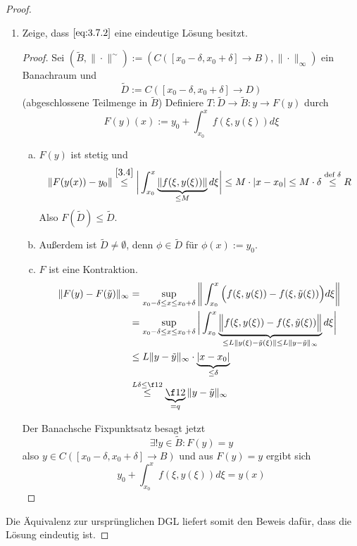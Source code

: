 \begin{st}
\begin{proof}
\begin{enumerate}[1)]
\begin{proof}
\begin{seg}
					\end{seg}
				\end{proof}
			\item
				Zeige, dass $\eqref{eq:3.7.2}$ eine eindeutige Lösung besitzt.
				\begin{proof}
					Sei $(\tilde B, \|\cdot\|^{\sim}) := (C([x_0-\delta, x_0+\delta] \to B), \|\cdot\|_\infty)$ ein Banachraum und
					\[
						\tilde D := C([x_0 -\delta, x_0 + \delta] \to D) 
					\]
					(abgeschlossene Teilmenge in $\tilde B$)
					Definiere $T: \tilde D \to \tilde B : y \to F(y)$ durch
					\[
						F(y)(x) := y_0 + \int_{x_0}^x f(\xi, y(\xi)) d\xi
					\]
					\begin{enumerate}[a)]
						\item
							$F(y)$ ist stetig und
							\[
								\|F(y(x)) - y_0 \|
								\stackrel{\ref{3.4}}\le \bigg| \int_{x_0}^x \underbrace{\|f(\xi, y(\xi))\|}_{\le M} d\xi \bigg|
								\le M \cdot |x - x_0|
								\le M \cdot \delta
								\stackrel{\text{def } \delta}\le R
							\]
							Also $F(\tilde D ) \le \tilde D$.
						\item
							Außerdem ist $\tilde D \neq \emptyset$, denn $\phi \in \tilde D$ für $\phi(x) := y_0$.
						\item
							$F$ ist eine Kontraktion.
							\begin{align*}
								\|F(y) - F(\tilde y)\|_\infty
								&= \sup_{x_0-\delta \le x \le x_0+\delta} \bigg\| \int_{x_0}^x \Big( f(\xi, y(\xi)) - f(\xi, \tilde y(\xi)) \Big) d\xi \bigg\| \\
								&= \sup_{x_0-\delta \le x \le x_0+\delta} \bigg| \int_{x_0}^x \underbrace{\Big\| f(\xi, y(\xi)) - f(\xi, \tilde y(\xi)) \Big\|}_{\le L \|y(\xi)-\tilde y(\xi)\| \le L \|y-\tilde y\|_\infty} d\xi \bigg| \\
								&\le L \|y-\tilde y\|_\infty \cdot \underbrace{|x-x_0|}_{\le \delta} \\
								&\stackrel{L \delta \le \f 12} \le \underbrace{\f 12}_{=q} \|y-\tilde y\|_\infty
							\end{align*}
					\end{enumerate}
					Der Banachsche Fixpunktsatz besagt jetzt
					\[
						\exists! y \in \tilde B : F(y) = y
					\]
					also $y \in C([x_0-\delta, x_0+\delta] \to B)$ und aus $F(y) = y$ ergibt sich
					\[
						y_0  + \int_{x_0}^x f(\xi, y(\xi)) d \xi = y(x)
					\]
				\end{proof}
		\end{enumerate}
		Die Äquivalenz zur ursprünglichen DGL liefert somit den Beweis dafür, dass die Lösung eindeutig ist.
	\end{proof}
\end{st}


